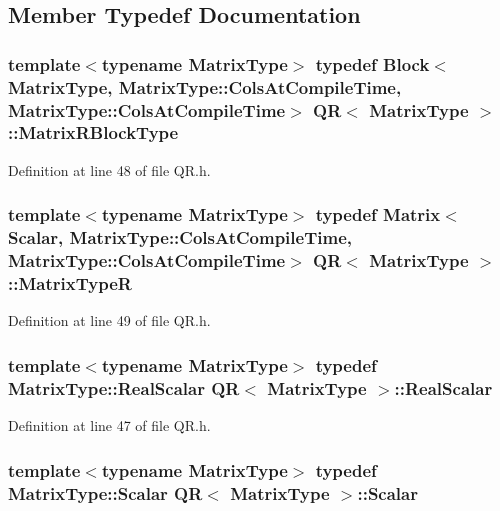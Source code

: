 \subsection{Member Typedef Documentation}
\hypertarget{class_q_r_a91f032a54dbe9fd7ba2351326b6d1f13}{
\subsubsection[{Matrix\-R\-Block\-Type}]{\setlength{\rightskip}{0pt plus 5cm}template$<$typename Matrix\-Type$>$ typedef {\bf Block}$<$Matrix\-Type, Matrix\-Type\-::\-Cols\-At\-Compile\-Time, Matrix\-Type\-::\-Cols\-At\-Compile\-Time$>$ {\bf Q\-R}$<$ Matrix\-Type $>$\-::{\bf Matrix\-R\-Block\-Type}}}\label{class_q_r_a91f032a54dbe9fd7ba2351326b6d1f13}


Definition at line 48 of file Q\-R.\-h.

\hypertarget{class_q_r_aaeacfc768cb9f327bdf69962473059d0}{
\subsubsection[{Matrix\-Type\-R}]{\setlength{\rightskip}{0pt plus 5cm}template$<$typename Matrix\-Type$>$ typedef {\bf Matrix}$<${\bf Scalar}, Matrix\-Type\-::\-Cols\-At\-Compile\-Time, Matrix\-Type\-::\-Cols\-At\-Compile\-Time$>$ {\bf Q\-R}$<$ Matrix\-Type $>$\-::{\bf Matrix\-Type\-R}}}\label{class_q_r_aaeacfc768cb9f327bdf69962473059d0}


Definition at line 49 of file Q\-R.\-h.

\hypertarget{class_q_r_a88b7ec70e1ec3baf52eca8fc2163d517}{
\subsubsection[{Real\-Scalar}]{\setlength{\rightskip}{0pt plus 5cm}template$<$typename Matrix\-Type$>$ typedef Matrix\-Type\-::\-Real\-Scalar {\bf Q\-R}$<$ Matrix\-Type $>$\-::{\bf Real\-Scalar}}}\label{class_q_r_a88b7ec70e1ec3baf52eca8fc2163d517}


Definition at line 47 of file Q\-R.\-h.

\hypertarget{class_q_r_a5f4284ebeb0fde1aea76f13a0732efb1}{
\subsubsection[{Scalar}]{\setlength{\rightskip}{0pt plus 5cm}template$<$typename Matrix\-Type$>$ typedef Matrix\-Type\-::\-Scalar {\bf Q\-R}$<$ Matrix\-Type $>$\-::{\bf Scalar}}}\label{class_q_r_a5f4284ebeb0fde1aea76f13a0732efb1}


